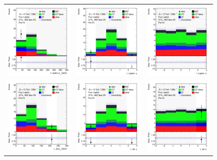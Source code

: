 \begin{figure}[htbp]
\begin{tabular}{ccc}
    \includegraphics[width=.25\textwidth]{figures/PreFitPlots/lep4_tWZ_3T1L_L_lepton_pt.png} &
    \includegraphics[width=.25\textwidth]{figures/PreFitPlots/lep4_tWZ_3T1L_L_lepton_eta.png} &
    \includegraphics[width=.25\textwidth]{figures/PreFitPlots/lep4_tWZ_3T1L_L_lepton_phi.png} \\
    \includegraphics[width=.25\textwidth]{figures/PreFitPlots/lep4_tWZ_3T1L_LJet_pt.png} &
    \includegraphics[width=.25\textwidth]{figures/PreFitPlots/lep4_tWZ_3T1L_LJet_eta.png} &
    \includegraphics[width=.25\textwidth]{figures/PreFitPlots/lep4_tWZ_3T1L_LJet_phi.png} \\


\end{tabular}
\end{figure}
